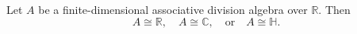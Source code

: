 Let $A$ be a finite-dimensional associative division algebra over $\mathbb{R}$. Then
$$A \cong \mathbb{R}, \quad A \cong \mathbb{C}, \quad \text{or} \quad A \cong \mathbb{H}.$$
